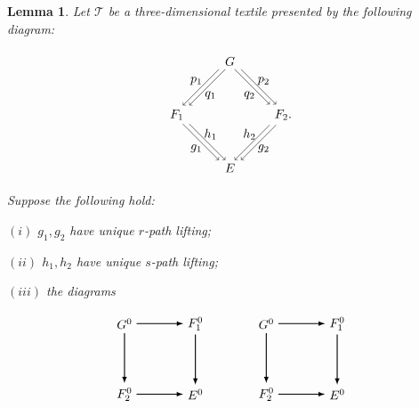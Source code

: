 \documentclass[10pt,a4paper]{amsart}
\newtheorem{lem}{Lemma}
\begin{document}
\begin{lem}\label{lem other pullbacks}
Let $\mathcal{T}$ be a three-dimensional textile presented by the following diagram: 

\[
\begin{tikzpicture}[scale=1]
\node[inner sep=2.5pt, circle] (B) at (-1.5,0) {$F_1$};
\node[inner sep=2.5pt, circle] (C) at (1.5,0) {$F_2.$};	
\node[inner sep=2.5pt, circle] (D) at (0,-1.5) {$E$};
\node[inner sep=2.5pt, circle] (A) at (0,1.5) {$G$}; 

\draw[transform canvas={xshift=0.6ex}, ->] (A) -- (B);
\draw[transform canvas={xshift=-0.6ex}, ->] (A) -- (B);

\draw[transform canvas={xshift=0.6ex}, ->] (A) -- (C);
\draw[transform canvas={xshift=-0.6ex}, ->] (A) -- (C);

\draw[transform canvas={xshift=0.6ex}, ->] (C) -- (D);
\draw[transform canvas={xshift=-0.6ex}, ->] (C) -- (D);

\draw[transform canvas={xshift=0.6ex}, ->] (B) -- (D);
\draw[transform canvas={xshift=-0.6ex}, ->] (B) -- (D);

\node at (-0.55,0.55) {$q_1$};
\node at (-0.95,0.95) {$p_1$};

\node at (0.55,0.55) {$q_2$};
\node at (0.95,0.95) {$p_2$};

\node at (-0.55,-0.55) {$h_1$};
\node at (-0.95,-0.95) {$g_1$};

\node at (0.55,-0.55) {$h_2$};
\node at (0.95,-0.95) {$g_2$};
\end{tikzpicture}
\] Suppose the following hold: 

$(i)$ $g_1,g_2$ have unique $r$-path lifting;

$(ii)$ $h_1,h_2$ have unique $s$-path lifting;

$(iii)$ the diagrams 

\[
\begin{tikzpicture}[scale=1]
\node[] (A1) at (0,0) {$G^0$};
\node[] (A2) at (2,0) {$F_1^0$};
\node[] (A3) at (4,0) {$G^0$};
\node[] (A4) at (6,0) {$F_1^0$};

\node[] (B1) at (0,-2) {$F_2^0$};
\node[] (B2) at (2,-2) {$E^0$};
\node[] (B3) at (4,-2) {$F_2^0$};
\node[] (B4) at (6,-2) {$E^0$};


\path[->, >=latex,thick] (A1) edge [] node[]{} (A2);
\path[->, >=latex,thick] (B1) edge [] node[]{} (B2);
\path[->, >=latex,thick] (A3) edge [] node[]{} (A4);
\path[->, >=latex,thick] (B3) edge [] node[]{} (B4);

\path[->, >=latex,thick] (A1) edge [] node[]{} (B1);
\path[->, >=latex,thick] (A2) edge [] node[]{} (B2);
\path[->, >=latex,thick] (A3) edge [] node[]{} (B3);
\path[->, >=latex,thick] (A4) edge [] node[]{} (B4);


\end{tikzpicture}\]
\end{lem}
\end{document}
